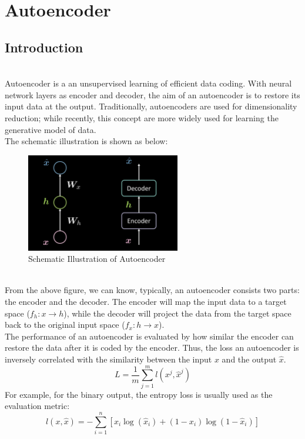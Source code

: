 \chapter{ Autoencoder }
\section{ Introduction }
\\
Autoencoder is a an unsupervised learning of efficient data coding. With neural network layers as encoder and decoder, the aim of an autoencoder is to restore its input data at the output.  Traditionally, autoencoders are used for dimensionality reduction; while recently, this concept are more widely used for learning the generative model of data.
\\
The schematic illustration is shown as below:
\\
\begin{figure}[htb]
    \centering
    \includegraphics[width=0.6\textwidth]{labs/09/images/Schematic_Illustration_of_Autoencoder.png}
    \caption{Schematic Illustration of Autoencoder}
    \label{fig:Schematic_Illustration_of_Autoencoder}
\end{figure}
\\
From the above figure, we can know, typically, an autoencoder consists two parts: the encoder and the decoder. The encoder will map the input data to a target space ($f_h: x\rightarrow h$), while the decoder will project the data from the target space back to the original input space ($f_x: h\rightarrow \hat{x}$).
\\
The performance of an autoencoder is evaluated by how similar the encoder can restore the data after it is coded by the encoder. Thus, the loss an autoencoder is inversely correlated with the similarity between the input $x$ and the output $\hat{x}$. 
$$ L=\frac{1}{m}\sum_{j=1}^m l(x^j,\hat{x}^j) $$
For example, for the binary output, the entropy loss is usually used as the evaluation metric:
$$ l(x,\hat{x}) = -\sum_{i=1}^n[x_i\log(\hat{x}_i) + (1-x_i)\log(1-\hat{x}_i) ]$$
